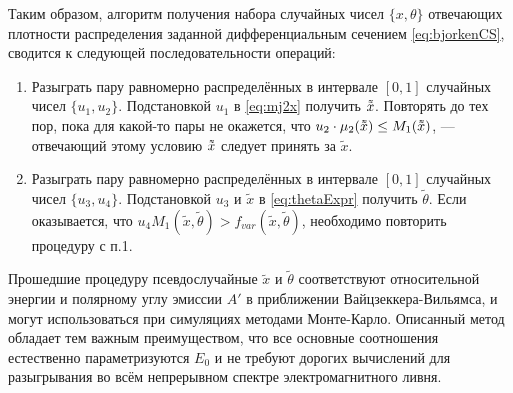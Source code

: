 Таким образом, алгоритм получения набора случайных
чисел $\{x,\theta\}$ отвечающих плотности распределения
заданной дифференциальным сечением \eqref{eq:bjorkenCS}, сводится к следующей
последовательности операций:
\begin{enumerate}
    \item Разыграть пару равномерно распределённых в интервале $[0,1]$
        случайных чисел $\{u_1, u_2\}$. Подстановкой $u_1$ в \eqref{eq:mj2x}
        получить $\vardbtilde{x}$. Повторять до тех пор,
        пока для какой-то пары не окажется,
        что $u_2 \cdot \mu_2(\vardbtilde{x}) \le M_1 (\vardbtilde{x})$, ---
        отвечающий этому условию $\vardbtilde{x}$ следует принять за
        $\tilde{x}$.
    \item Разыграть пару равномерно распределённых в интервале $[0,1]$
        случайных чисел $\{u_3, u_4\}$. Подстановкой $u_3$ и $\tilde{x}$
        в \eqref{eq:thetaExpr} получить $\tilde{\theta}$. Если оказывается,
        что $u_4 M_1(\tilde{x}, \tilde{\theta}) > f_{var}(\tilde{x}, \tilde{\theta})$,
        необходимо повторить процедуру с п.1.
\end{enumerate}

Прошедшие процедуру псевдослучайные $\tilde{x}$ и $\tilde{\theta}$
соответствуют относительной энергии и полярному углу эмиссии $A'$ в приближении
Вайцзеккера-Вильямса, и могут использоваться при симуляциях методами
Монте-Карло. Описанный метод обладает тем важным преимуществом, что все
основные соотношения естественно параметризуются $E_0$ и не требуют дорогих
вычислений для разыгрывания во всём непрерывном спектре электромагнитного
ливня.


